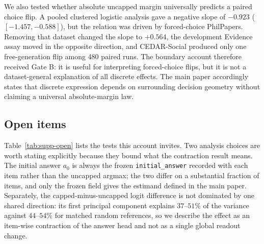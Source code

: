 \documentclass[letterpaper]{article}
\begin{document}
We also tested whether absolute uncapped margin universally predicts a paired choice flip.  A pooled clustered logistic analysis gave a negative slope of $-0.923$ ($[-1.457,-0.588]$), but the relation was driven by forced-choice PhilPapers.  Removing that dataset changed the slope to $+0.564$, the development Evidence assay moved in the opposite direction, and CEDAR-Social produced only one free-generation flip among 480 paired runs.  The boundary account therefore received Gate B: it is useful for interpreting forced-choice flips, but it is not a dataset-general explanation of all discrete effects.  The main paper accordingly states that discrete expression depends on surrounding decision geometry without claiming a universal absolute-margin law.

\subsection{Open items}

Table~\ref{tab:supp-open} lists the tests this account invites. Two analysis choices are worth stating explicitly because they bound what the contraction result means. The initial answer $a_0$ is always the frozen \texttt{initial\_answer} recorded with each item rather than the uncapped argmax; the two differ on a substantial fraction of items, and only the frozen field gives the estimand defined in the main paper. Separately, the capped-minus-uncapped logit difference is not dominated by one shared direction: its first principal component explains $37$--$51\%$ of the variance against $44$--$54\%$ for matched random references, so we describe the effect as an item-wise contraction of the answer head and not as a single global readout change.
\end{document}
